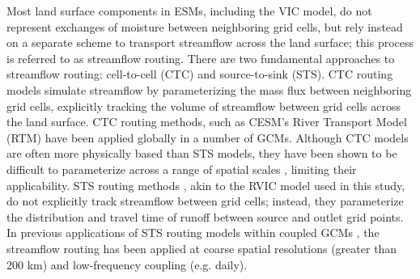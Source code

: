 \documentclass[jgrga, draft]{agutex}
\begin{document}
\begin{article}
Most land surface components in ESMs, including the VIC model, do not represent exchanges of moisture between neighboring grid cells, but rely instead on a separate scheme to transport streamflow across the land surface; this process is referred to as streamflow routing.
There are two fundamental approaches to streamflow routing: cell-to-cell (CTC) and source-to-sink (STS).
CTC routing models simulate streamflow by parameterizing the mass flux between neighboring grid cells, explicitly tracking the volume of streamflow between grid cells across the land surface.
CTC routing methods, such as CESM's River Transport Model (RTM) \citep{Branstetter_2003} have been applied globally in a number of GCMs.
Although CTC models are often more physically based than STS models, they have been shown to be difficult to parameterize across a range of spatial scales \citep{Sushama_2004}, limiting their applicability.
STS routing methods \citep[e.g.][]{Lohmann_1996,Naden_1992}, akin to the RVIC model used in this study, do not explicitly track streamflow between grid cells; instead, they parameterize the distribution and travel time of runoff between source and outlet grid points.
In previous applications of STS routing models within coupled GCMs \citep[e.g.][]{Olivera_2000}, the streamflow routing has been applied at coarse spatial resolutions (greater than 200 km) and low-frequency coupling (e.g. daily).


\end{article}
\end{document}
